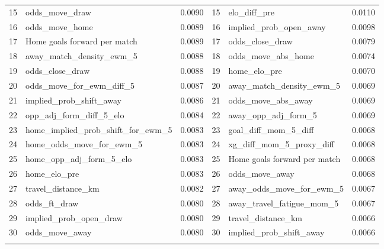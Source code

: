 \documentclass[pdflatex,sn-mathphys-num]{sn-jnl}
\theoremstyle{thmstyleone}
\theoremstyle{thmstyletwo}
\theoremstyle{thmstylethree}
\begin{document}
\begin{table}[h]
\begin{tabular*}{\textwidth}{@{\extracolsep\fill}rlc|rlc@{}}
15 & odds\_move\_draw                   & 0.0090 & 15 & elo\_diff\_pre                          & 0.0110 \\
16 & odds\_move\_home                   & 0.0089 & 16 & implied\_prob\_open\_away               & 0.0098 \\
17 & Home goals forward per match       & 0.0089 & 17 & odds\_close\_draw                       & 0.0079 \\
18 & away\_match\_density\_ewm\_5        & 0.0088 & 18 & odds\_move\_abs\_home                   & 0.0074 \\
19 & odds\_close\_draw                  & 0.0088 & 19 & home\_elo\_pre                          & 0.0070 \\
20 & odds\_move\_for\_ewm\_diff\_5        & 0.0087 & 20 & away\_match\_density\_ewm\_5            & 0.0069 \\
21 & implied\_prob\_shift\_away           & 0.0086 & 21 & odds\_move\_abs\_away                   & 0.0069 \\
22 & opp\_adj\_form\_diff\_5\_elo         & 0.0084 & 22 & away\_opp\_adj\_form\_5                  & 0.0069 \\
23 & home\_implied\_prob\_shift\_for\_ewm\_5 & 0.0083 & 23 & goal\_diff\_mom\_5\_diff               & 0.0068 \\
24 & home\_odds\_move\_for\_ewm\_5        & 0.0083 & 24 & xg\_diff\_mom\_5\_proxy\_diff           & 0.0068 \\
25 & home\_opp\_adj\_form\_5\_elo         & 0.0083 & 25 & Home goals forward per match            & 0.0068 \\
26 & home\_elo\_pre                     & 0.0083 & 26 & odds\_move\_away                        & 0.0068 \\
27 & travel\_distance\_km                & 0.0082 & 27 & away\_odds\_move\_for\_ewm\_5           & 0.0067 \\
28 & odds\_ft\_draw                     & 0.0080 & 28 & away\_travel\_fatigue\_mom\_5           & 0.0067 \\
29 & implied\_prob\_open\_draw           & 0.0080 & 29 & travel\_distance\_km                    & 0.0066 \\
30 & odds\_move\_away                   & 0.0080 & 30 & implied\_prob\_shift\_away              & 0.0066 \\
\botrule
\end{tabular*}
\end{table}
\end{document}
